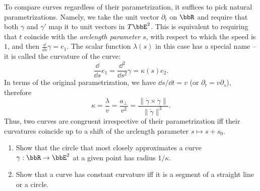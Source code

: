 \begin{example}
    To compare curves regardless of their parametrization, it suffices to pick natural parametrizations. Namely, we take the unit vector $\partial_t$ on $\bbR$ and require that both $\gamma$ and $\gamma'$ map it to unit vectors in $T\bbE^2$. This is equivalent to requiring that $t$ coincide with the \emph{arclength parameter} $s$, with respect to which the speed is $1$, and then $\frac{\dd}{\dd s} \gamma=e_1$. The scalar function $\lambda(s)$ in this case has a special name -- it is called the curvature of the curve:
    \[\frac{\dd}{\dd s}e_1=\frac{\dd^2}{\dd s^2}\gamma=\kappa(s)e_2.\]
    In terms of the original parametrization, we have $\dd s/\dd t=v$ (or $\partial_t=v\partial_s$), therefore 
    \[\kappa=\frac{\lambda}{v}=\frac{a_{\perp}}{v^2}=\frac{\lVert\dot\gamma\times \ddot\gamma\rVert}{\lVert\dot\gamma\rVert^3}.\]
    Thus, two curves are congruent irrespective of their parametrization iff their curvatures coincide up to a shift of the arclength parameter $s\mapsto s+s_0$.
\end{example}

\begin{xca}
    \begin{enumerate}
        \item Show that the circle that most closely approximates a curve $\gamma:\bbR\to \bbE^2$ at a given point has radius $1/\kappa$.
        \item  Show that a curve has constant curvature iff it is a segment of a straight line or a circle.
    \end{enumerate}
\end{xca}

